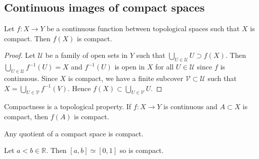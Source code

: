 \subsection{Continuous images of compact spaces}
\begin{theorem}
	Let \( f \colon X \to Y \) be a continuous function between topological spaces such that \( X \) is compact.
	Then \( f(X) \) is compact.
\end{theorem}
\begin{proof}
	Let \( \mathcal U \) be a family of open sets in \( Y \) such that \( \bigcup_{U \in \mathcal U} U \supset f(X) \).
	Then \( \bigcup_{U \in \mathcal U} f^{-1}(U) = X \) and \( f^{-1}(U) \) is open in \( X \) for all \( U \in \mathcal U \) since \( f \) is continuous.
	Since \( X \) is compact, we have a finite subcover \( \mathcal V \subset \mathcal U \) such that \( X = \bigcup_{U \in \mathcal V} f^{-1}(V) \).
	Hence \( f(X) \subset \bigcup_{U \in \mathcal V} U \).
\end{proof}
\begin{remark}
	Compactness is a topological property.
	If \( f \colon X \to Y \) is continuous and \( A \subset X \) is compact, then \( f(A) \) is compact.
\end{remark}
\begin{corollary}
	Any quotient of a compact space is compact.
\end{corollary}
\begin{example}
	Let \( a < b \in \mathbb R \).
	Then \( [a,b] \simeq [0,1] \) so is compact.
\end{example}

